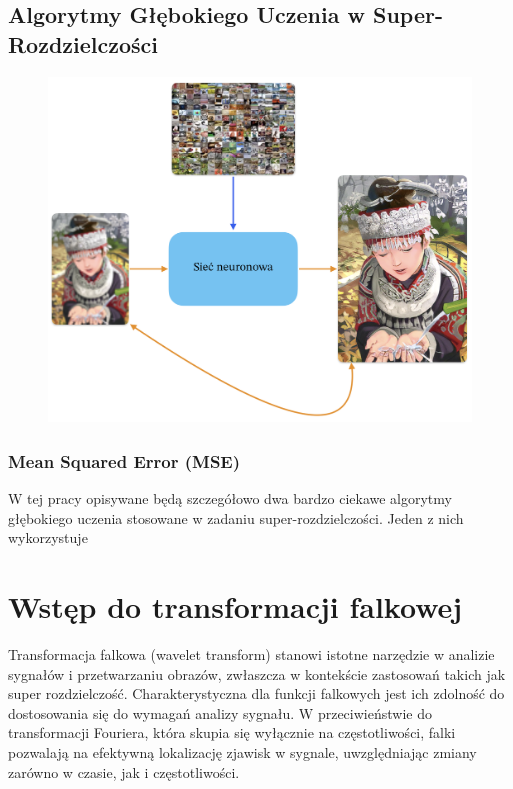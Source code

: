 \subsection*{Algorytmy Głębokiego Uczenia w Super-Rozdzielczości}

\begin{figure}[h]
    \centering
    \includegraphics[width=0.5\linewidth]{Rozdziały/02.Podstawy_teoretyczne/Obrazy/map_low-hi_res.png}
    \caption{}
    \label{fig:image18}
\end{figure}



\subsubsection*{Mean Squared Error (MSE)}
\cite{4775883}

W tej pracy opisywane będą szczegółowo dwa bardzo ciekawe algorytmy głębokiego uczenia stosowane w zadaniu super-rozdzielczości. Jeden z nich wykorzystuje 


\newpage
\section{Wstęp do transformacji falkowej}


Transformacja falkowa (wavelet transform) stanowi istotne narzędzie w analizie sygnałów i przetwarzaniu obrazów, zwłaszcza w kontekście zastosowań takich jak super rozdzielczość. Charakterystyczna dla funkcji falkowych jest ich zdolność do dostosowania się do wymagań analizy sygnału. W przeciwieństwie do transformacji Fouriera, która skupia się wyłącznie na częstotliwości, falki pozwalają na efektywną lokalizację zjawisk w sygnale, uwzględniając zmiany zarówno w czasie, jak i częstotliwości.

